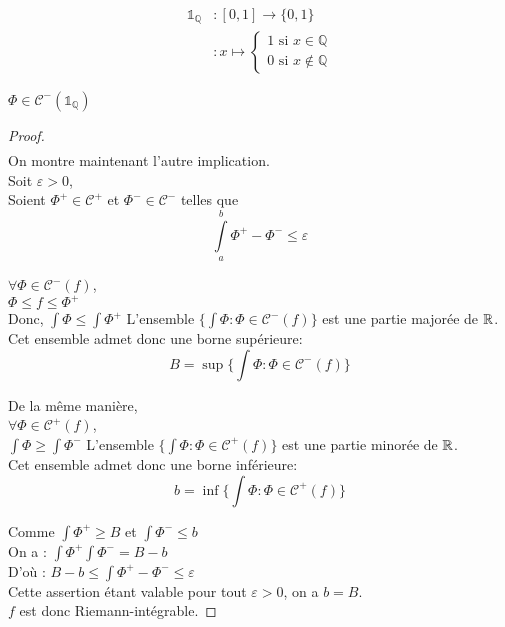 \documentclass[../main.tex]{subfile}
\begin{document}
\begin{ex}
	$$
	\begin{aligned}
	\mathbb{1}_{\mathbb{Q}} &: [0, 1] \to \{0, 1\}\\
	&: x \mapsto 
	\left \{
	\begin{array}{l}
		1 \text{ si } x \in \mathbb{Q}\\
		0 \text{ si } x \notin \mathbb{Q}
	\end{array}
	\right .
	\end{aligned}
	$$

	$\Phi \in \mathcal{C}^-(\mathbb{1}_\mathbb{Q})$
\end{ex}

\begin{proof}



	$$\phantom{a}$$
	On montre maintenant l'autre implication.\\
	Soit $\varepsilon > 0$, \\
	Soient $\Phi^+ \in \mathcal{C}^+$ et $\Phi^- \in \mathcal{C}^-$ telles que
	$$\int\limits_a^b \Phi^+ - \Phi^- \leq \varepsilon$$

	$\forall \Phi \in \mathcal{C}^-(f)$, \\
	$\Phi \leq f \leq \Phi^+$\\
	Donc, $\int \Phi \leq \int \Phi^+$
	L'ensemble $\{\int \Phi : \Phi \in \mathcal{C}^-(f)\}$ est une partie majorée de $\mathbb{R}$.\\
	Cet ensemble admet donc une borne supérieure:
	$$B = \sup \{\int \Phi : \Phi \in \mathcal{C}^-(f)\}$$

	De la même manière, \\
	$\forall \Phi \in \mathcal{C}^+(f)$, \\
	$\int \Phi \geq \int \Phi^-$
	L'ensemble $\{\int \Phi : \Phi \in \mathcal{C}^+(f)\}$ est une partie minorée de $\mathbb{R}$.\\
	Cet ensemble admet donc une borne inférieure:
	$$b = \inf \{\int \Phi : \Phi \in \mathcal{C}^+(f)\}$$

	Comme $\int \Phi^+ \geq B$ et $\int \Phi^- \leq b$\\
	On a : $\int \Phi^+ \int \Phi^- = B - b$\\
	D'où : $B - b \leq \int \Phi^+ - \Phi^- \leq \varepsilon$\\

	Cette assertion étant valable pour tout $\varepsilon > 0$, on a $b = B$.\\
	$f$ est donc Riemann-intégrable.
\end{proof}
\end{document}

